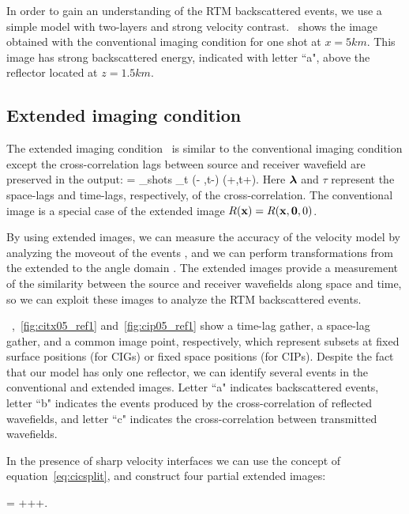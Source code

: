 In order to gain an understanding of the RTM backscattered events, we use a simple model with two-layers and strong velocity
contrast.~ shows the image obtained with the conventional imaging condition for one shot at $x=5km$. This image has strong 
backscattered energy, indicated with letter ``a", above the reflector located at $z=1.5km$.

\subsection{Extended imaging condition}

The extended imaging condition~\citep{rickett:883,sava:S209,GPR:GPR888} is similar to the conventional imaging condition
 except the cross-correlation lags between source and receiver wavefield are preserved in the output:
\beq
\Re= \sum_{shots} \sum_{t} \US(\xx - \hh,t-\tau) \UR(\xx+\hh,t+\tau).
\label{eq:eic}
\eeq
Here ${\boldsymbol{\lambda}}$ and $\tau$ represent the space-lags and time-lags, respectively, of the cross-correlation.
%
The conventional image is a special case of the extended image $R({\bf x})=R({\bf x},{\bf 0},0)$.

By using extended images, we can measure the accuracy of the velocity model by analyzing the moveout of the events
 \citep{yang:S151}, and we can perform transformations from the extended to the angle domain 
\citep{sava:1065,sava:S209,sava:S131}. The extended images provide a measurement of the similarity between the source
 and receiver wavefields along space and time, so we can exploit these images to analyze the RTM backscattered events.


~,~\ref{fig:citx05_ref1} and~\ref{fig:cip05_ref1} show a time-lag gather, a space-lag gather,
 and a common image point, respectively, which represent subsets at fixed surface positions (for CIGs) or fixed space positions 
(for CIPs). Despite the fact that our model has only one reflector, we can identify several events in the conventional and extended images. 
Letter ``a" indicates backscattered events, letter ``b" indicates the events produced by the cross-correlation of 
reflected wavefields, and letter ``c" indicates the cross-correlation between transmitted wavefields.

In the presence of sharp velocity interfaces we can use the concept of equation~\ref{eq:cicsplit}, and construct four partial 
extended images:

\beq
 \Re= +++.
\label{eq:eicsplit}
\eeq

